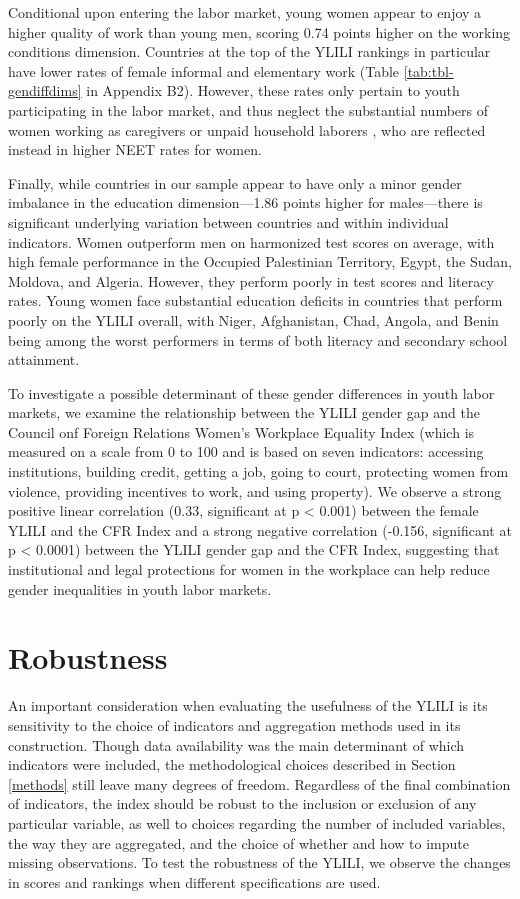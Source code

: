 \documentclass[
  a4paper, twoside, 12pt]{book}
\begin{document}
Conditional upon entering the labor market, young women appear to enjoy a higher quality of work than young men, scoring 0.74 points higher on the working conditions dimension. Countries at the top of the YLILI rankings in particular have lower rates of female informal and elementary work (Table \ref{tab:tbl-gendiffdims} in Appendix B2). However, these rates only pertain to youth participating in the labor market, and thus neglect the substantial numbers of women working as caregivers or unpaid household laborers \autocite{ilo2023b}, who are reflected instead in higher NEET rates for women.

Finally, while countries in our sample appear to have only a minor gender imbalance in the education dimension---1.86 points higher for males---there is significant underlying variation between countries and within individual indicators. Women outperform men on harmonized test scores on average, with high female performance in the Occupied Palestinian Territory, Egypt, the Sudan, Moldova, and Algeria. However, they perform poorly in test scores and literacy rates. Young women face substantial education deficits in countries that perform poorly on the YLILI overall, with Niger, Afghanistan, Chad, Angola, and Benin being among the worst performers in terms of both literacy and secondary school attainment.

To investigate a possible determinant of these gender differences in youth labor markets, we examine the relationship between the YLILI gender gap and the Council onf Foreign Relations Women's Workplace Equality Index (which is measured on a scale from 0 to 100 and is based on seven indicators: accessing institutions, building credit, getting a job, going to court, protecting women from violence, providing incentives to work, and using property). We observe a strong positive linear correlation (0.33, significant at p \textless{} 0.001) between the female YLILI and the CFR Index and a strong negative correlation (-0.156, significant at p \textless{} 0.0001) between the YLILI gender gap and the CFR Index, suggesting that institutional and legal protections for women in the workplace can help reduce gender inequalities in youth labor markets.

\hypertarget{robustness}{%
\section{Robustness}\label{robustness}}

An important consideration when evaluating the usefulness of the YLILI is its sensitivity to the choice of indicators and aggregation methods used in its construction. Though data availability was the main determinant of which indicators were included, the methodological choices described in Section \ref{methods} still leave many degrees of freedom. Regardless of the final combination of indicators, the index should be robust to the inclusion or exclusion of any particular variable, as well to choices regarding the number of included variables, the way they are aggregated, and the choice of whether and how to impute missing observations. To test the robustness of the YLILI, we observe the changes in scores and rankings when different specifications are used.
\end{document}
